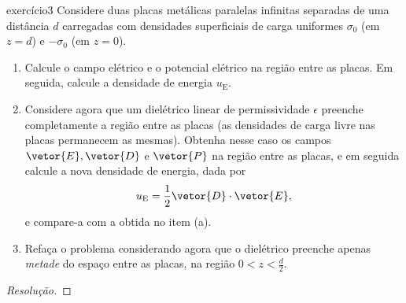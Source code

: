 \begin{exercício}{}{exercício3}
    Considere duas placas metálicas paralelas infinitas separadas de uma distância \(d\) carregadas com densidades superficiais de carga uniformes \(\sigma_0\) (em \(z = d\)) e \(-\sigma_0\) (em \(z = 0\)).
    \begin{enumerate}[label=(\alph*)]
        \item Calcule o campo elétrico e o potencial elétrico na região entre as placas. Em seguida, calcule a densidade de energia \(u_\mathrm{E}\).
        \item Considere agora que um dielétrico linear de permissividade \(\epsilon\) preenche completamente a região entre as placas (as densidades de carga livre nas placas permanecem as mesmas). Obtenha nesse caso os campos \(\vetor{E}, \vetor{D}\) e \(\vetor{P}\) na região entre as placas, e em seguida calcule a nova densidade de energia, dada por
            \begin{equation*}
                u_\mathrm{E} = \frac12 \vetor{D}\cdot \vetor{E},
            \end{equation*}
            e compare-a com a obtida no item (a).
        \item Refaça o problema considerando agora que o dielétrico preenche apenas \emph{metade} do espaço entre as placas, na região \(0 < z < \frac{d}2\).
    \end{enumerate}
\end{exercício}
\begin{proof}[Resolução]

\end{proof}
